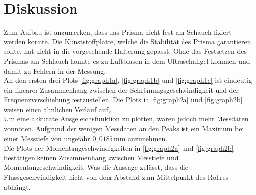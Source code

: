 \section{Diskussion}
\label{sec:diskussion}

Zum Aufbau ist anzumerken, dass das Prisma nicht fest am Schauch fixiert werden konnte. Die Kunststoffplatte, welche die Stabilität des Prisma garantieren sollte, hat nicht in die vorgesehende Halterung gepasst.
Ohne das Festsetzen des Prismas am Schlauch konnte es zu Luftblasen in dem Ultraschallgel kommen und damit zu Fehlern in der Messung. \\

An den ersten drei Plots \autoref{fig:graph1a}, \autoref{fig:graph1b} und \autoref{fig:graph1c} ist eindeutig ein linearer Zusammenhang zwischen der Schrömungsgeschwindigkeit und der Frequenzverschiebung festzustellen.
Die Plots in \autoref{fig:graph2a} und \autoref{fig:graph2b} weisen einen ähnlichen Verlauf auf,. \\
Um eine akkurate Ausgeleichsfunktion zu plotten, wären jedoch mehr Messdaten vonnöten. 
Aufgrund der wenigen Messdaten an den Peaks ist ein Maximum bei einer Messtiefe von ungefähr $0,0185  \, \unit{\milli\meter}$ anzunehmen. \\

Die Plots der Momentangeschwindigkeiten in \autoref{fig:graph2a} und \autoref{fig:graph2b} bestätigen keinen Zusammenhang zwischen Messtiefe und Momentangeschwindigkeit.
Was die Aussage zulässt, dass die Flussgeschwindigkeit nicht von dem Abstand zum Mittelpunkt des Rohres abhängt.